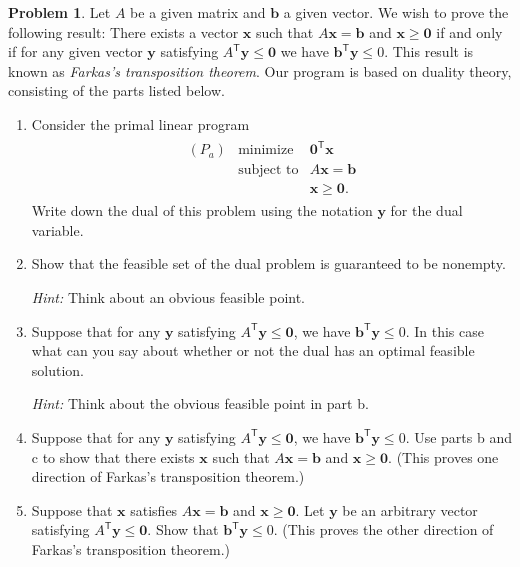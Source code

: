 \documentclass[12pt]{article}
\theoremstyle{definition}
\newtheorem{problem}{Problem}
\newcommand{\vc}[1]{\boldsymbol{#1}}
\newcommand{\tran}{\mathsf{T}}
\begin{document}
\begin{problem}
  Let $A$ be a given matrix and $\vc{b}$ a given vector. We wish to prove the
  following result: There exists a vector $\vc{x}$ such that $A\vc{x} = \vc{b}$ and
  $\vc{x} \geq \vc{0}$ if and only if for any given vector $\vc{y}$ satisfying $A^\tran \vc{y} \leq \vc{0}$
  we have $\vc{b}^\tran \vc{y} \leq 0$. This result is known as \textit{Farkas's transposition theorem}.
  Our program is based on duality theory, consisting of the parts listed below.
  \begin{enumerate}
    \item Consider the primal linear program
      \begin{align*}
        \begin{array}{rrl}
          (P_a) & \text{minimize} & \vc{0}^\tran \vc{x} \\
          & \text{subject to} & A\vc{x} = \vc{b} \\
          & & \vc{x} \geq \vc{0}.
        \end{array}
      \end{align*}
      Write down the dual of this problem using the notation $\vc{y}$ for the dual variable.
    \item Show that the feasible set of the dual problem is guaranteed to be nonempty.

      \textit{Hint:} Think about an obvious feasible point.
    \item Suppose that for any $\vc{y}$ satisfying $A^\tran \vc{y} \leq \vc{0}$,
      we have $\vc{b}^\tran \vc{y} \leq 0$. In this case what can you say about whether
      or not the dual has an optimal feasible solution.

      \textit{Hint:} Think about the obvious feasible point in part b.
    \item Suppose that for any $\vc{y}$ satisfying $A^\tran \vc{y} \leq \vc{0}$,
      we have $\vc{b}^\tran \vc{y} \leq 0$. Use parts b and c to show that there exists
      $\vc{x}$ such that $A\vc{x} = \vc{b}$ and $\vc{x} \geq \vc{0}$. (This proves one
      direction of Farkas's transposition theorem.)
    \item Suppose that $\vc{x}$ satisfies $A\vc{x} = \vc{b}$ and $\vc{x} \geq \vc{0}$.
      Let $\vc{y}$ be an arbitrary vector satisfying $A^\tran \vc{y} \leq \vc{0}$.
      Show that $\vc{b}^\tran\vc{y} \leq 0$. (This proves the other direction of Farkas's transposition theorem.)
  \end{enumerate}
\end{problem}
\end{document}
